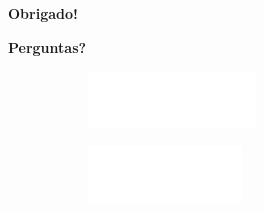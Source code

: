 \documentclass[aspectratio=169,t,xcolor=table]{beamer}
\begin{document}
\begin{frame}
    \centering
    \vspace{3cm}
    
    \textbf{\Huge Obrigado!}
    
    \vspace{1cm}
    
    \textbf{\Large Perguntas?}
    
    \vspace{3cm}
    \begin{figure}
        \centering
        \begin{subfigure}{0.2\textwidth}
            \centering
            \includegraphics[height=1.5cm]{lib/logos/infw.png}
        \end{subfigure}%
        \qquad 
        \begin{subfigure}{0.2\textwidth}
            \centering
            \includegraphics[height=1.5cm]{lib/logos/ufgw.png}
        \end{subfigure}
    \end{figure}
\end{frame}
\end{document}
